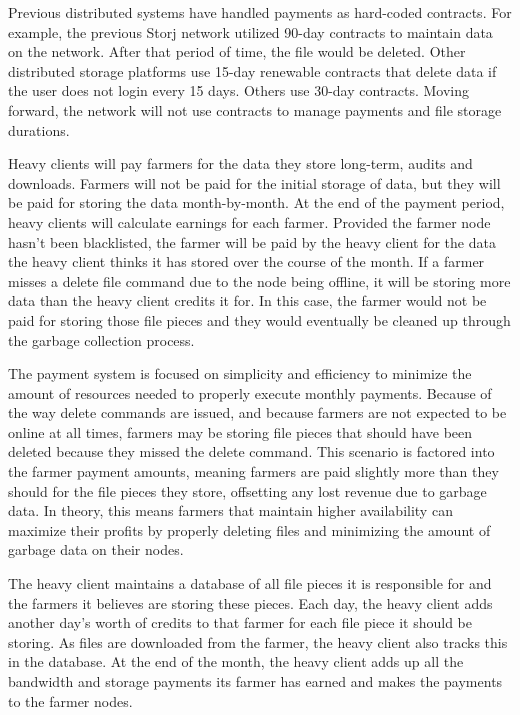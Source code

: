 \documentclass[a4paper,10pt]{article} \usepackage[utf8]{inputenc}
\begin{document}
Previous distributed systems have handled payments as hard-coded contracts.
For example, the previous Storj network utilized 90-day contracts to maintain
data on the network. After that period of time, the file would be deleted.
Other distributed storage platforms use 15-day renewable contracts that delete
data if the user does not login every 15 days. Others use 30-day contracts.
Moving forward, the network will not use contracts to manage payments and file
storage durations.

Heavy clients will pay farmers for the data they store long-term, audits and
downloads. Farmers will not be paid for the initial storage of data, but they
will be paid for storing the data month-by-month. At the end of the payment
period, heavy clients will calculate earnings for each farmer. Provided the
farmer node hasn’t been blacklisted, the farmer will be paid by the heavy
client for the data the heavy client thinks it has stored over the course of
the month. If a farmer misses a delete file command due to the node being
offline, it will be storing more data than the heavy client credits it for. In
this case, the farmer would not be paid for storing those file pieces and they
would eventually be cleaned up through the garbage collection process.

The payment system is focused on simplicity and efficiency to minimize the
amount of resources needed to properly execute monthly payments. Because of the
way delete commands are issued, and because farmers are not expected to be
online at all times, farmers may be storing file pieces that should have been
deleted because they missed the delete command. This scenario is factored into
the farmer payment amounts, meaning farmers are paid slightly more than they
should for the file pieces they store, offsetting any lost revenue due to
garbage data. In theory, this means farmers that maintain higher availability
can maximize their profits by properly deleting files and minimizing the amount
of garbage data on their nodes.

The heavy client maintains a database of all file pieces it is responsible for
and the farmers it believes are storing these pieces. Each day, the heavy
client adds another day’s worth of credits to that farmer for each file piece
it should be storing. As files are downloaded from the farmer, the heavy client
also tracks this in the database. At the end of the month, the heavy client
adds up all the bandwidth and storage payments its farmer has earned and makes
the payments to the farmer nodes.
\end{document}
